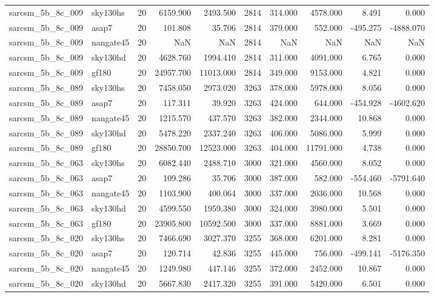 \documentclass{article}
\begin{document}
\begin{longtable}{llrrrrrrrr}
sarcsm\_5b\_8c\_009 & sky130hs & 20 & 6159.900 & 2493.500 & 2814 & 314.000 & 4578.000 & 8.491 & 0.000 \\
sarcsm\_5b\_8c\_009 & asap7 & 20 & 101.808 & 35.706 & 2814 & 379.000 & 552.000 & -495.275 & -4888.070 \\
sarcsm\_5b\_8c\_009 & nangate45 & 20 & NaN & NaN & 2814 & NaN & NaN & NaN & NaN \\
sarcsm\_5b\_8c\_009 & sky130hd & 20 & 4628.760 & 1994.410 & 2814 & 311.000 & 4091.000 & 6.765 & 0.000 \\
sarcsm\_5b\_8c\_009 & gf180 & 20 & 24957.700 & 11013.000 & 2814 & 349.000 & 9153.000 & 4.821 & 0.000 \\
sarcsm\_5b\_8c\_089 & sky130hs & 20 & 7458.050 & 2973.020 & 3263 & 378.000 & 5978.000 & 8.056 & 0.000 \\
sarcsm\_5b\_8c\_089 & asap7 & 20 & 117.311 & 39.920 & 3263 & 424.000 & 644.000 & -454.928 & -4602.620 \\
sarcsm\_5b\_8c\_089 & nangate45 & 20 & 1215.570 & 437.570 & 3263 & 382.000 & 2344.000 & 10.868 & 0.000 \\
sarcsm\_5b\_8c\_089 & sky130hd & 20 & 5478.220 & 2337.240 & 3263 & 406.000 & 5086.000 & 5.999 & 0.000 \\
sarcsm\_5b\_8c\_089 & gf180 & 20 & 28850.700 & 12523.000 & 3263 & 404.000 & 11791.000 & 4.738 & 0.000 \\
sarcsm\_5b\_8c\_063 & sky130hs & 20 & 6082.440 & 2488.710 & 3000 & 321.000 & 4560.000 & 8.052 & 0.000 \\
sarcsm\_5b\_8c\_063 & asap7 & 20 & 109.286 & 35.706 & 3000 & 387.000 & 582.000 & -554.460 & -5791.640 \\
sarcsm\_5b\_8c\_063 & nangate45 & 20 & 1103.900 & 400.064 & 3000 & 337.000 & 2036.000 & 10.568 & 0.000 \\
sarcsm\_5b\_8c\_063 & sky130hd & 20 & 4599.550 & 1959.380 & 3000 & 324.000 & 3980.000 & 5.501 & 0.000 \\
sarcsm\_5b\_8c\_063 & gf180 & 20 & 23905.800 & 10592.500 & 3000 & 337.000 & 8881.000 & 3.669 & 0.000 \\
sarcsm\_5b\_8c\_020 & sky130hs & 20 & 7466.690 & 3027.370 & 3255 & 368.000 & 6201.000 & 8.281 & 0.000 \\
sarcsm\_5b\_8c\_020 & asap7 & 20 & 120.714 & 42.836 & 3255 & 445.000 & 756.000 & -499.141 & -5176.350 \\
sarcsm\_5b\_8c\_020 & nangate45 & 20 & 1249.980 & 447.146 & 3255 & 372.000 & 2452.000 & 10.867 & 0.000 \\
sarcsm\_5b\_8c\_020 & sky130hd & 20 & 5667.830 & 2417.320 & 3255 & 391.000 & 5420.000 & 6.501 & 0.000 \\

\end{longtable}
\end{document}
